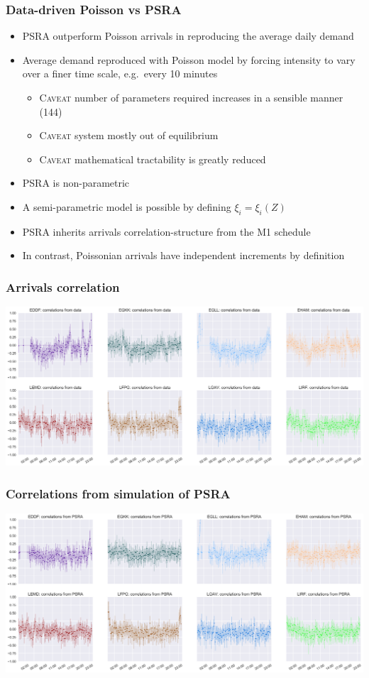 \documentclass[table,aspectratio=169]{beamer}
\begin{document}
\begin{frame}[t]\frametitle{Data-driven Poisson vs PSRA}
    \begin{itemize}
        \item PSRA outperform Poisson arrivals in reproducing the average daily demand
        \item Average demand reproduced with Poisson model by \alert{forcing}
        intensity to vary over a finer time scale, e.g.\ every 10 minutes
        \begin{itemize}
            \item \alert{\textsc{Caveat}} number of parameters required increases in a sensible manner (144)
            \item \alert{\textsc{Caveat}} system mostly out of equilibrium
            \item \alert{\textsc{Caveat}} mathematical tractability is greatly reduced
        \end{itemize}
        \item PSRA is non-parametric
        \item A semi-parametric model is possible by defining $\xi_i = \xi_i(Z)$
        \item PSRA inherits \alert{arrivals correlation-structure} from the M1 schedule
        \item In contrast, Poissonian arrivals have \alert{independent increments} by definition
    \end{itemize}
\end{frame}

\begin{frame}[t]\frametitle{Arrivals correlation}
    \centering
    \includegraphics[width=.9\textwidth]{correlations_true}
\end{frame}

\begin{frame}[t]\frametitle{Correlations from simulation of PSRA}
    \centering
    \includegraphics[width=.9\textwidth]{correlations_psra}
\end{frame}
\end{document}

